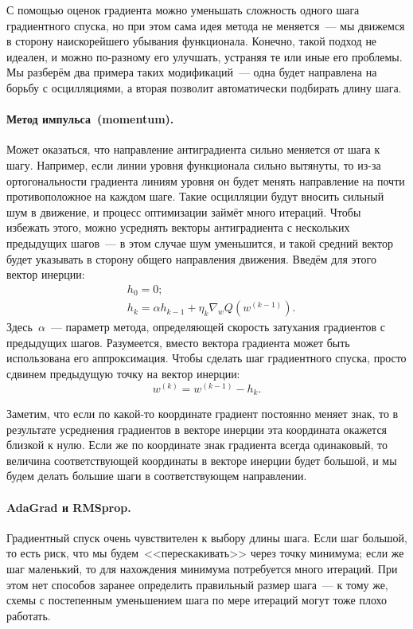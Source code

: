 \documentclass[12pt,fleqn]{article}
\begin{document}
С помощью оценок градиента можно уменьшать сложность одного шага градиентного спуска,
но при этом сама идея метода не меняется~--- мы движемся в сторону наискорейшего убывания функционала.
Конечно, такой подход не идеален, и можно по-разному его улучшать, устраняя те или иные его проблемы.
Мы разберём два примера таких модификаций~--- одна будет направлена на борьбу с осцилляциями, а вторая
позволит автоматически подбирать длину шага.

\paragraph{Метод импульса~(momentum).}
Может оказаться, что направление антиградиента сильно меняется от шага к шагу.
Например, если линии уровня функционала сильно вытянуты, то из-за ортогональности градиента линиям уровня
он будет менять направление на почти противоположное на каждом шаге.
Такие осцилляции будут вносить сильный шум в движение, и процесс оптимизации займёт много итераций.
Чтобы избежать этого, можно усреднять векторы антиградиента с нескольких предыдущих шагов~--- в этом
случае шум уменьшится, и такой средний вектор будет указывать в сторону общего направления движения.
Введём для этого вектор инерции:
\begin{align*}
    &h_0 = 0;\\
    &h_k = \alpha h_{k - 1} + \eta_k \nabla_w Q(w^{(k-1)}).
\end{align*}
Здесь~$\alpha$~--- параметр метода, определяющей скорость затухания градиентов с предыдущих шагов.
Разумеется, вместо вектора градиента может быть использована его аппроксимация.
Чтобы сделать шаг градиентного спуска, просто сдвинем предыдущую точку на вектор инерции:
\[
    w^{(k)} = w^{(k-1)} - h_k.
\]

Заметим, что если по какой-то координате градиент постоянно меняет знак, то в результате усреднения
градиентов в векторе инерции эта координата окажется близкой к нулю.
Если же по координате знак градиента всегда одинаковый, то величина соответствующей координаты
в векторе инерции будет большой, и мы будем делать большие шаги в соответствующем направлении.

\paragraph{AdaGrad и RMSprop.}
Градиентный спуск очень чувствителен к выбору длины шага.
Если шаг большой, то есть риск, что мы будем~<<перескакивать>> через точку минимума;
если же шаг маленький, то для нахождения минимума потребуется много итераций.
При этом нет способов заранее определить правильный размер шага~--- к тому же,
схемы с постепенным уменьшением шага по мере итераций могут тоже плохо работать.
\end{document}
